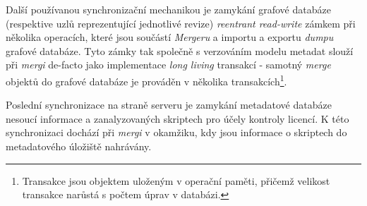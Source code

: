 Další používanou synchronizační mechanikou je zamykání grafové databáze (respektive uzlů reprezentující jednotlivé revize) \textit{reentrant read-write} zámkem při několika operacích, které jsou součástí \textit{Mergeru} a importu a exportu \textit{dumpu} grafové databáze. Tyto zámky tak společně s verzováním modelu metadat slouží při \textit{mergi} de-facto jako implementace \textit{long living} transakcí - samotný \textit{merge} objektů do grafové databáze je prováděn v několika transakcích\footnote{Transakce jsou objektem uloženým v operační paměti, přičemž velikost transakce narůstá s počtem úprav v databázi.}.

Poslední synchronizace na straně serveru je zamykání metadatové databáze nesoucí informace a zanalyzovaných skriptech pro účely kontroly licencí. K této synchronizaci dochází při \textit{mergi} v okamžiku, kdy jsou informace o skriptech do metadatového úložiště nahrávány.


